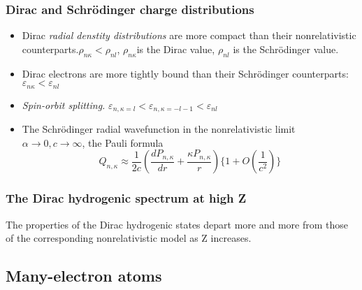 \documentclass[a4paper,lang=cn,a4paper]{elegantpaper}
\begin{document}
\subsubsection{Dirac and Schr\"{o}dinger charge distributions}
\begin{itemize}
    \item Dirac \textit{radial denstity distributions} are more compact
    than their nonrelativistic counterparts.$\rho_{n\kappa}<\rho_{nl}$,
    $\rho_{n\kappa}$is the Dirac value, $\rho_{nl}$ is the Schr\"{o}dinger value.
    \item Dirac electrons are more tightly bound than their Schr\"{o}dinger counterparts:$\varepsilon_{n\kappa}<\varepsilon_{nl}$
    \item \textit{Spin-orbit splitting.}  $\varepsilon_{n,\kappa=l}<\varepsilon_{n,\kappa=-l-1}<\varepsilon_{nl}$
    \item The Schr\"{o}dinger radial wavefunction in the nonrelativistic 
    limit $\alpha\rightarrow 0,c\rightarrow \infty$, the Pauli formula
    \begin{equation*}
        Q_{n,\kappa}\approx \frac{1}{2c}\left(\frac{dP_{n,\kappa}}{dr}+\frac{\kappa P_{n,\kappa}}{r}\right)
        \{1+O(\frac{1}{c^2})\}
    \end{equation*}
\end{itemize}

\subsubsection{The Dirac hydrogenic spectrum at high Z}
The properties of the Dirac hydrogenic states depart more and 
more from those of the corresponding nonrelativistic model as Z
increases.

\subsection{Many-electron atoms}
\end{document}
